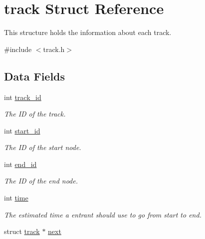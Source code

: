 \hypertarget{structtrack}{\section{track Struct Reference}
\label{structtrack}
}


This structure holds the information about each track.  




{\ttfamily \#include $<$track.\-h$>$}

\subsection*{Data Fields}
{\bf }\par
\begin{DoxyCompactItemize}
\item 
\hypertarget{structtrack_a097b8071abc2ebd656c006eaa1f5a304}{int \hyperlink{structtrack_a097b8071abc2ebd656c006eaa1f5a304}{track\-\_\-id}}\label{structtrack_a097b8071abc2ebd656c006eaa1f5a304}

\begin{DoxyCompactList}\small\item\em The I\-D of the track. \end{DoxyCompactList}\item 
\hypertarget{structtrack_a3179f9cd9386e19e6beb07abeba0cbd7}{int \hyperlink{structtrack_a3179f9cd9386e19e6beb07abeba0cbd7}{start\-\_\-id}}\label{structtrack_a3179f9cd9386e19e6beb07abeba0cbd7}

\begin{DoxyCompactList}\small\item\em The I\-D of the start node. \end{DoxyCompactList}\item 
\hypertarget{structtrack_a22a8ab7c657a047485b3eb89b11a0b70}{int \hyperlink{structtrack_a22a8ab7c657a047485b3eb89b11a0b70}{end\-\_\-id}}\label{structtrack_a22a8ab7c657a047485b3eb89b11a0b70}

\begin{DoxyCompactList}\small\item\em The I\-D of the end node. \end{DoxyCompactList}\item 
\hypertarget{structtrack_a99f2dbdd246a9b56f3b4569ca7984370}{int \hyperlink{structtrack_a99f2dbdd246a9b56f3b4569ca7984370}{time}}\label{structtrack_a99f2dbdd246a9b56f3b4569ca7984370}

\begin{DoxyCompactList}\small\item\em The estimated time a entrant should use to go from start to end. \end{DoxyCompactList}\item 
\hypertarget{structtrack_a582f88132985aa04fe32bc6542f28c4c}{struct \hyperlink{structtrack}{track} $\ast$ \hyperlink{structtrack_a582f88132985aa04fe32bc6542f28c4c}{next}}\label{structtrack_a582f88132985aa04fe32bc6542f28c4c}


\end{DoxyCompactItemize}
